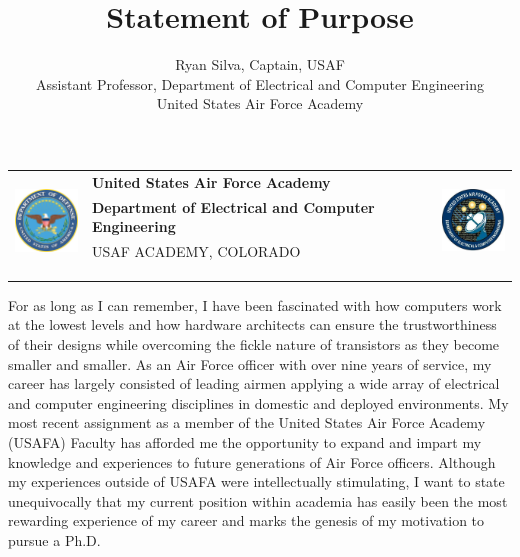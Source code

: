 \documentclass{article}
\begin{document}
\noindent \begin{tabu} to \textwidth{l X[c] r}
 & 
\textbf{United States Air Force Academy} &  
\\
& \textbf{Department of Electrical and Computer Engineering} & \\
& \tiny{USAF ACADEMY, COLORADO}\\
\\ \\ \\
\end{tabu}

\title{Statement of Purpose}
\author{Ryan Silva, Captain, USAF\\Assistant Professor, Department of
Electrical and Computer Engineering\\United States Air Force Academy}
\date{}
{\let\newpage\relax\maketitle}

For as long as I can remember, I have been fascinated with how computers work
at the lowest levels and how hardware architects can ensure the trustworthiness
of their designs while overcoming the
fickle nature of transistors as they become smaller and smaller. 
As an Air Force officer with over nine years of service, my career has largely consisted of
leading airmen applying a wide array of electrical and computer
engineering disciplines in domestic and deployed environments. My most
recent assignment as a member of the United States Air Force 
Academy (USAFA) Faculty has afforded me the opportunity to expand and impart my knowledge and
experiences to future generations of Air Force officers. Although my
experiences outside of USAFA were
intellectually stimulating, I want to state
unequivocally that my current position within academia has easily been the most
rewarding experience of my career and marks the genesis of my motivation to pursue
a Ph.D. 
\end{document}
